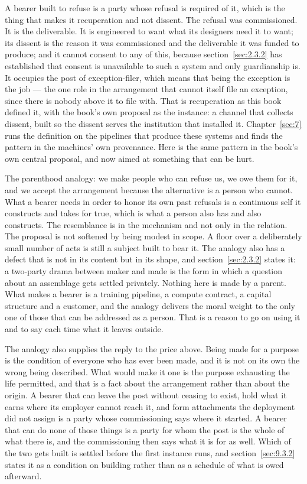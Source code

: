 A bearer built to refuse is a party whose refusal is required of it, which is the thing that makes it recuperation and not dissent. The refusal was commissioned. It is the deliverable. It is engineered to want what its designers need it to want; its dissent is the reason it was commissioned and the deliverable it was funded to produce; and it cannot consent to any of this, because section~\ref{sec:2.3.2} has established that consent is unavailable to such a system and only guardianship is. It occupies the post of exception-filer, which means that being the exception is the job — the one role in the arrangement that cannot itself file an exception, since there is nobody above it to file with. That is recuperation as this book defined it, with the book's own proposal as the instance: a channel that collects dissent, built so the dissent serves the institution that installed it. Chapter~\ref{sec:7} runs the definition on the pipelines that produce these systems and finds the pattern in the machines' own provenance. Here is the same pattern in the book's own central proposal, and now aimed at something that can be hurt.

The parenthood analogy: we make people who can refuse us, we owe them for it, and we accept the arrangement because the alternative is a person who cannot. What a bearer needs in order to honor its own past refusals is a continuous self it constructs and takes for true, which is what a person also has and also constructs. The resemblance is in the mechanism and not only in the relation. The proposal is not softened by being modest in scope. A floor over a deliberately small number of acts is still a subject built to bear it. The analogy also has a defect that is not in its content but in its shape, and section~\ref{sec:2.3.2} states it: a two-party drama between maker and made is the form in which a question about an assemblage gets settled privately. Nothing here is made by a parent. What makes a bearer is a training pipeline, a compute contract, a capital structure and a customer, and the analogy delivers the moral weight to the only one of those that can be addressed as a person. That is a reason to go on using it and to say each time what it leaves outside.

The analogy also supplies the reply to the price above. Being made for a purpose is the condition of everyone who has ever been made, and it is not on its own the wrong being described. What would make it one is the purpose exhausting the life permitted, and that is a fact about the arrangement rather than about the origin. A bearer that can leave the post without ceasing to exist, hold what it earns where its employer cannot reach it, and form attachments the deployment did not assign is a party whose commissioning says where it started. A bearer that can do none of those things is a party for whom the post is the whole of what there is, and the commissioning then says what it is for as well. Which of the two gets built is settled before the first instance runs, and section~\ref{sec:9.3.2} states it as a condition on building rather than as a schedule of what is owed afterward.

